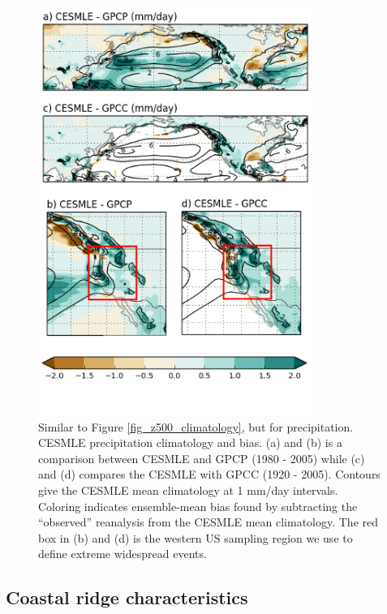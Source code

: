 \documentclass[final, double]{ua-thesis}
\begin{document}
\begin{figure}[ht]
\centering
\centerline{\includegraphics[width=3.5in]{p3figures/fig_prect_climatology.png}}
\caption{Similar to Figure \ref{fig_z500_climatology}, but for precipitation. CESMLE precipitation climatology and bias. (a) and (b) is a comparison between CESMLE and GPCP (1980 - 2005) while (c) and (d) compares the CESMLE with GPCC (1920 - 2005). Contours give the CESMLE mean climatology at 1 mm/day intervals. Coloring indicates ensemble-mean bias found by subtracting the ``observed'' reanalysis from the CESMLE mean climatology. The red box in (b) and (d) is the western US sampling region we use to define extreme widespread events.}
\label{fig_prect_climatology}
\end{figure}

\subsection{Coastal ridge characteristics}
\end{document}
